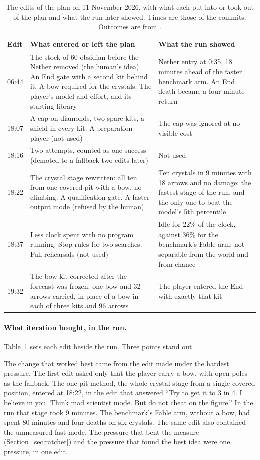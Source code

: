 \documentclass[11pt,a4paper]{article}
\begin{document}
\begin{table}[!tbp]
\caption{The edits of the plan on 11 November 2026, with what each put into or took out of the plan and what the run later showed. Times are those of the commits. Outcomes are from \citet{batsuk2026fifth}.}
\label{tab:edits}
\small
\begin{tabularx}{\textwidth}{@{}l>{\raggedright\arraybackslash}X>{\raggedright\arraybackslash}X@{}}
\toprule
Edit & What entered or left the plan & What the run showed \\
\midrule
06:44 & The stock of 60 obsidian before the Nether removed (the human's idea). An End gate with a second kit behind it. A bow required for the crystals. The player's model and effort, and its starting library & Nether entry at 0:35, 18 minutes ahead of the faster benchmark arm. An End death became a four-minute return \\
18:07 & A cap on diamonds, two spare kits, a shield in every kit. A preparation player (not used) & The cap was ignored at no visible cost \\
18:16 & Two attempts, counted as one success (demoted to a fallback two edits later) & Not used \\
18:22 & The crystal stage rewritten: all ten from one covered pit with a bow, no climbing. A qualification gate. A faster output mode (refused by the human) & Ten crystals in 9 minutes with 18 arrows and no damage: the fastest stage of the run, and the only one to beat the model's 5th percentile \\
18:37 & Less clock spent with no program running. Stop rules for two searches. Full rehearsals (not used) & Idle for 22\% of the clock, against 36\% for the benchmark's Fable arm; not separable from the world and from chance \\
19:32 & The bow kit corrected after the forecast was frozen: one bow and 32 arrows carried, in place of a bow in each of three kits and 96 arrows & The player entered the End with exactly that kit \\
\bottomrule
\end{tabularx}
\end{table}

\paragraph{What iteration bought, in the run.} Table~\ref{tab:edits} sets each edit beside the run. Three points stand out.

The change that worked best came from the edit made under the hardest pressure. The first edit asked only that the player carry a bow, with open poles as the fallback. The one-pit method, the whole crystal stage from a single covered position, entered at 18:22, in the edit that answered ``Try to get it to 3 in 4. I believe in you. Think mad scientist mode. But do not cheat on the figure.'' In the run that stage took 9 minutes. The benchmark's Fable arm, without a bow, had spent 80 minutes and four deaths on six crystals. The same edit also contained the unmeasured fast mode. The pressure that bent the measure (Section~\ref{sec:ratchet}) and the pressure that found the best idea were one pressure, in one edit.
\end{document}
